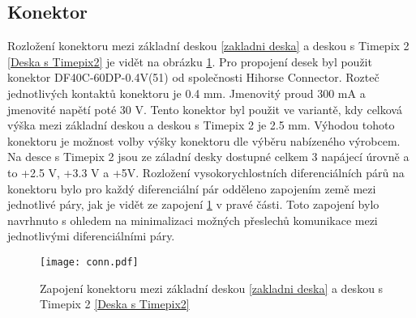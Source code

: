 	\subsection{Konektor}	%
	\label{konektor}
	Rozložení konektoru mezi základní deskou \ref{zakladni deska} a deskou s Timepix 2 \ref{Deska s Timepix2} je vidět na obrázku \ref{fig:konektor}. Pro propojení desek byl použit konektor DF40C-60DP-0.4V(51) od společnosti Hihorse Connector. Rozteč jednotlivých kontaktů konektoru je 0.4 mm. Jmenovitý proud 300 mA a jmenovité napětí poté 30 V. Tento konektor byl použit ve variantě, kdy celková výška mezi základní deskou a deskou s Timepix 2 je 2.5 mm. Výhodou tohoto konektoru je možnost volby výšky konektoru dle výběru nabízeného výrobcem. Na desce s Timepix 2 jsou ze záladní desky dostupné celkem 3 napájecí úrovně a to +2.5 V, +3.3 V a +5V. Rozložení vysokorychlostních diferenciálních párů na konektoru bylo pro každý diferenciální pár odděleno zapojením země mezi jednotlivé páry, jak je vidět ze zapojení \ref{fig:konektor} v pravé části. Toto zapojení bylo navrhnuto s ohledem na minimalizaci možných přeslechů komunikace mezi jednotlivými diferenciálními páry.
	\begin{figure}[h!]
		\centering
		\captionsetup{justification=centering}
		\texttt{[image: conn.pdf]}
		\caption{Zapojení konektoru mezi základní deskou \ref{zakladni deska} a deskou s Timepix 2 \ref{Deska s Timepix2}} 
		\label{fig:konektor}
	\end{figure} 
	

